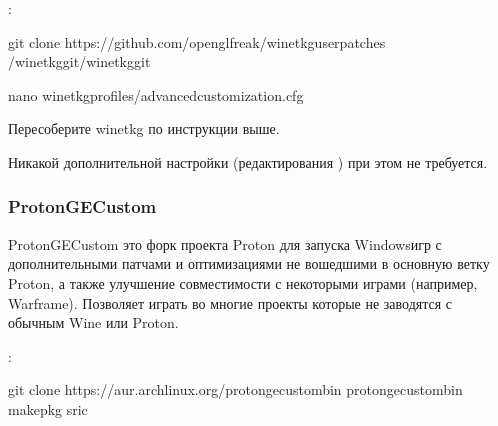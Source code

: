 \documentclass[letterpaper,10pt,russian,openany]{sphinxmanual}
\begin{document}
\sphinxAtStartPar
{}:

\begin{sphinxVerbatim}[commandchars=\\\{\}]
git clone https://github.com/openglfreak/wine\PYGZhy{}tkg\PYGZhy{}userpatches
 \PYGZti{}/wine\PYGZhy{}tkg\PYGZhy{}git/wine\PYGZhy{}tkg\PYGZhy{}git

nano wine\PYGZhy{}tkg\PYGZhy{}profiles/advanced\PYGZhy{}customization.cfg 

\end{sphinxVerbatim}

\sphinxAtStartPar
Пересоберите wine\sphinxhyphen{}tkg по инструкции выше.

\sphinxAtStartPar
Никакой дополнительной настройки (редактирования ) при этом не требуется.

\ignorespaces 

\subsubsection{Proton\sphinxhyphen{}GE\sphinxhyphen{}Custom}
\label{\detokenize{source/linux-gaming:proton-ge-custom}}\label{\detokenize{source/linux-gaming:index-7}}\label{\detokenize{source/linux-gaming:id7}}
\sphinxAtStartPar
Proton\sphinxhyphen{}GE\sphinxhyphen{}Custom это форк проекта Proton для запуска Windows\sphinxhyphen{}игр с дополнительными патчами и оптимизациями не вошедшими в основную ветку Proton,
а также улучшение совместимости с некоторыми играми (например, Warframe).
Позволяет играть во многие проекты которые не заводятся с обычным Wine или Proton.

\sphinxAtStartPar
{}:

\begin{sphinxVerbatim}[commandchars=\\\{\}]
git clone https://aur.archlinux.org/proton\PYGZhy{}ge\PYGZhy{}custom\PYGZhy{}bin
 proton\PYGZhy{}ge\PYGZhy{}custom\PYGZhy{}bin
makepkg \PYGZhy{}sric
\end{sphinxVerbatim}
\end{document}
